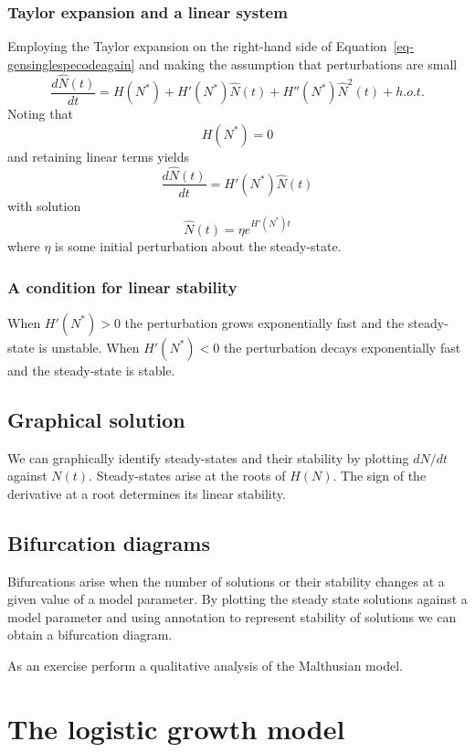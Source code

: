 \documentclass[
  letterpaper,
  DIV=11,
  numbers=noendperiod]{scrreprt}
\begin{document}
\subsubsection{Taylor expansion and a linear
system}\label{taylor-expansion-and-a-linear-system}

Employing the Taylor expansion on the right-hand side of
Equation~\ref{eq-gensinglespecodeagain} and making the assumption that
perturbations are small \[
\frac{d\hat{N}(t) }{dt} = H(N^*)+  H'(N^*)\hat{N}(t) + H''(N^*)\hat{N}^2(t) + h.o.t.
\] Noting that\\
\[
H(N^*)=0
\] and retaining linear terms yields \[
\frac{d\hat{N}(t) }{dt} =  H'(N^*)\hat{N}(t)
\] with solution \[
\hat{N}(t)=  \eta e^{H'(N^*) t}
\] where \(\eta\) is some initial perturbation about the steady-state.

\subsubsection{A condition for linear
stability}\label{a-condition-for-linear-stability}

When \(H'(N^*)>0\) the perturbation grows exponentially fast and the
steady-state is unstable. When \(H'(N^*)<0\) the perturbation decays
exponentially fast and the steady-state is stable.

\subsection{Graphical solution}\label{graphical-solution}

We can graphically identify steady-states and their stability by
plotting \(dN/dt\) against \(N(t)\). Steady-states arise at the roots of
\(H(N)\). The sign of the derivative at a root determines its linear
stability.

\subsection{Bifurcation diagrams}\label{bifurcation-diagrams-1}

Bifurcations arise when the number of solutions or their stability
changes at a given value of a model parameter. By plotting the steady
state solutions against a model parameter and using annotation to
represent stability of solutions we can obtain a bifurcation diagram.

As an exercise perform a qualitative analysis of the Malthusian model.

\section{The logistic growth model}\label{the-logistic-growth-model}
\end{document}
